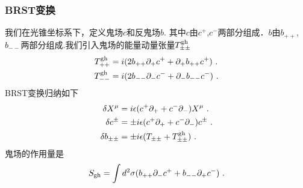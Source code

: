 \subsubsection{BRST变换}
我们在光锥坐标系下，定义鬼场$c$和反鬼场$b$. 其中$c$由$c^+$,$c^-$两部分组成．$b$由$b_{++}$,$b_{--}$两部分组成.我们引入鬼场的能量动量张量$T^{\rm gh}_{\pm\pm}$
\begin{equation}
\begin{aligned}
T^{\rm gh}_{++} &  = i (2 b_{++}\partial_+ c^+ +\partial_+ b_{++}c^+)~. \\
T^{\rm gh}_{--} &  = i (2 b_{--}\partial_- c^- +\partial_- b_{--}c^-)~.
\end{aligned}
\end{equation}
BRST变换归纳如下
\begin{equation}
\begin{aligned}
\delta X^\mu & = i \epsilon (c^+\partial_+ + c^- \partial_- ) X^\mu~. \\
\delta c^{\pm} & = \pm i \epsilon (c^+\partial_++c^-\partial_-) c^{\pm} ~. \\
\delta b_{\pm\pm} & = \pm i \epsilon (T_{\pm\pm} +T^{\rm gh}_{\pm\pm})~. 
\end{aligned}
\end{equation}
鬼场的作用量是
\begin{equation}
S_{\rm gh} = \int d^2\sigma (b_{++} \partial_- c^+ + b_{--} \partial_+ c^- ) ~.
\end{equation}























